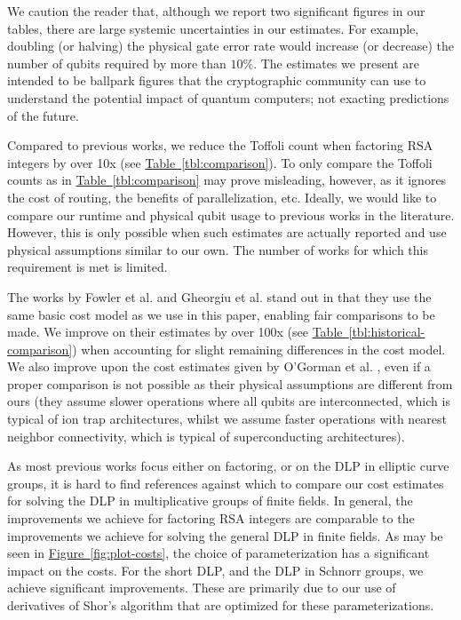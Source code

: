 \documentclass[superscriptaddress,notitlepage,longbibliography]{revtex4-1}
\theoremstyle{definition}
\theoremstyle{definition}
\newcommand{\fig}[1]{\hyperref[fig:#1]{Figure~\ref*{fig:#1}}}
\newcommand{\tbl}[1]{\hyperref[tbl:#1]{Table~\ref*{tbl:#1}}}
\begin{document}
We caution the reader that, although we report two significant figures in our tables, there are large systemic uncertainties in our estimates.
For example, doubling (or halving) the physical gate error rate would increase (or decrease) the number of qubits required by more than $10\%$.
The estimates we present are intended to be ballpark figures that the cryptographic community can use to understand the potential impact of quantum computers; not exacting predictions of the future.

Compared to previous works, we reduce the Toffoli count when factoring RSA integers by over 10x (see \tbl{comparison}).
To only compare the Toffoli counts as in \tbl{comparison} may prove misleading, however, as it ignores the cost of routing, the benefits of parallelization, etc.
Ideally, we would like to compare our runtime and physical qubit usage to previous works in the literature.
However, this is only possible when such estimates are actually reported and use physical assumptions similar to our own.
The number of works for which this requirement is met is limited.

The works by Fowler et al. \cite{fowler2012surfacecodereview} and Gheorgiu et al. \cite{gheorghiu2019cryptanalysis} stand out in that they use the same basic cost model as we use in this paper, enabling fair comparisons to be made.
We improve on their estimates by over 100x (see \tbl{historical-comparison}) when accounting for slight remaining differences in the cost model.
We also improve upon the cost estimates given by O'Gorman et al. \cite{ogorman2017factories}, even if a proper comparison is not possible as their physical assumptions are different from ours (they assume slower operations where all qubits are interconnected, which is typical of ion trap architectures, whilst we assume faster operations with nearest neighbor connectivity, which is typical of superconducting architectures).

As most previous works focus either on factoring, or on the DLP in elliptic curve groups, it is hard to find references against which to compare our cost estimates for solving the DLP in multiplicative groups of finite fields.
In general, the improvements we achieve for factoring RSA integers are comparable to the improvements we achieve for solving the general DLP in finite fields.
As may be seen in \fig{plot-costs}, the choice of parameterization has a significant impact on the costs.
For the short DLP, and the DLP in Schnorr groups, we achieve significant improvements.
These are primarily due to our use of derivatives of Shor's algorithm that are optimized for these parameterizations.
\end{document}
